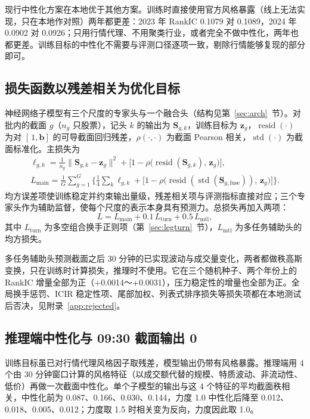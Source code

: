 \documentclass[UTF8,a4paper,zihao=-4,fontset=none]{ctexart}
\begin{document}
现行中性化方案在本地优于其他方案。训练时直接使用官方风格暴露（线上无法实现，只在本地作对照）两年都更差：2023 年 RankIC 0.1079 对 0.1089，2024 年 0.0902 对 0.0926；只用行情代理、不用聚类行业，或者完全不做中性化，两年也都更差。训练目标的中性化不需要与评测口径逐项一致，剔除行情能够复现的部分即可。

\subsection{损失函数以残差相关为优化目标}\label{sec:loss}

神经网络子模型有三个尺度的专家头与一个融合头（结构见第~\ref{sec:arch}~节）。对批内的截面 $g$（$n_g$ 只股票），记头 $k$ 的输出为 $\bm S_{g,k}$，训练目标为 $\bm z_g$，$\operatorname{resid}(\cdot)$ 为对 $[\,1,\bm b]$ 的可导截面回归残差，$\rho(\cdot,\cdot)$ 为截面 Pearson 相关，$\operatorname{std}(\cdot)$ 为截面标准化。主损失为
\begin{gather}
\ell_{g,k}=\frac{1}{n_g}\big\lVert \bm S_{g,k}-\bm z_g\big\rVert^2+\Big[1-\rho\big(\operatorname{resid}(\bm S_{g,k}),\,\bm z_g\big)\Big],\label{eq:headloss}\\
L_{\text{main}}=\frac{1}{G}\sum_{g=1}^{G}\Big\{\frac{1}{4}\sum_{k}\ell_{g,k}+\Big[1-\rho\big(\operatorname{resid}(\operatorname{std}(\bm S_{g,\text{fuse}})),\,\bm z_g\big)\Big]\Big\}.\label{eq:mainloss}
\end{gather}
均方误差项使训练稳定并约束输出量级，残差相关项与评测指标直接对应；三个专家头作为辅助监督，使每个尺度的表示本身具有预测力。总损失再加入两项：
\begin{equation}\label{eq:total}
L=L_{\text{main}}+0.1\,L_{\text{turn}}+0.5\,L_{\text{mtl}},
\end{equation}
其中 $L_{\text{turn}}$ 为多空组合换手正则项（第~\ref{sec:legturn}~节），$L_{\text{mtl}}$ 为多任务辅助头的均方损失。

多任务辅助头预测截面之后 30 分钟的已实现波动与成交量变化，两者都做秩高斯变换，只在训练时计算损失，推理时不使用。它在三个随机种子、两个年份上的 RankIC 增量全部为正（+0.0014～+0.0031），压力稳定性的增量也全部为正。全局换手惩罚、ICIR 稳定性项、尾部加权、列表式排序损失等损失项都在本地测试后否决，见附录~\ref{app:rejected}。

\subsection{推理端中性化与 09:30 截面输出 0}\label{sec:infer}

训练目标虽已对行情代理风格因子取残差，模型输出仍带有风格暴露。推理端用 4 个由 30 分钟窗口计算的风格特征（以成交额代替的规模、特质波动、非流动性、低价）再做一次截面中性化。单个子模型的输出与这 4 个特征的平均截面秩相关，中性化前为 0.087、0.166、0.030、0.144，力度 1.0 中性化后降至 0.012、0.018、0.005、0.012；力度取 1.5 时相关变为反向，力度因此取 1.0。
\end{document}
